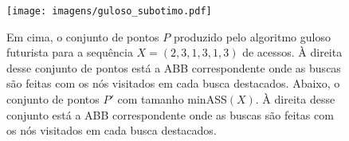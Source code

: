 \begin{comment}
        \begin{scope}[xshift=8cm] %
        \node [nodeteste] {3}
            child {node {1}
                child[missing] {}
                child {node {2}}}
            child[missing] {};
        \end{scope}
    \end{tikzpicture}
    \\
    \begin{tikzpicture}[
        level distance=1cm,
        level 1/.style={sibling distance=2cm},
        every node/.style={circle, draw=black!90, very thick, minimum size=8mm, inner sep=0pt, font=\large},
        edge from parent/.style={draw, solid, very thick},
        edge from parent path={(\tikzparentnode) -- (\tikzchildnode)},
        nodeteste/.style={circle, draw=teste, solid, minimum size=8mm, inner sep=0pt, font=\large, fill=teste!55},
        nodeBlack/.style={circle, draw=black, solid, minimum size=8mm, inner sep=0pt}
        ]
        \node [nodeteste] {3}
            child [nodeteste] {node [nodeteste] {1}
                child[missing] {}
                child [nodeBlack] {node {2}}}
            child[missing] {};
    
        \draw[->, very thick] (4,-0.5) -- (5,-0.5);
        \draw[->, very thick] (5,-1) -- (4,-1);
        \draw[->, very thick] (4,-3) -- (4,-4);
    
        \begin{scope}[xshift=8cm] %
        \node [nodeteste] {2}
            child [nodeteste] {node [nodeteste] {1}}
            child {node {3}};
        \end{scope}
    \end{tikzpicture}
    \caption{Em preto, os pontos de $P_X$ para uma sequência $X = (2,3,1,3,1,3)$ de acessos. À esquerda, o conjunto de pontos produzidos pelo Guloso futurista. À direita, o menor conjunto arboreamente satisfeito para $P_X$, de tamanho minASS$(P_X)$.}
\label{fig:greedy_subotimo}
\end{figure}
\end{comment}

\begin{figure}
    \centering
    \texttt{[image: imagens/guloso\_subotimo.pdf]}
    \caption{Em cima, o conjunto de pontos $P$ produzido pelo algoritmo guloso futurista para a sequência $X = (2,3,1,3,1,3)$ de acessos. À direita desse conjunto de pontos está a ABB correspondente onde as buscas são feitas com os nós visitados em cada busca destacados. Abaixo, o conjunto de pontos $P'$ com tamanho minASS$(X)$. À direita desse conjunto está a ABB correspondente onde as buscas são feitas com os nós visitados em cada busca destacados.}
\label{fig:greedy_subotimo}
\end{figure}

